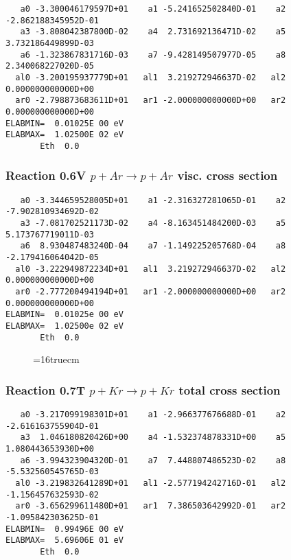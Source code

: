 \documentclass[12pt,dvipdfmx]{article}
\begin{document}
\begin{small}\begin{verbatim}
   a0 -3.300046179597D+01    a1 -5.241652502840D-01    a2 -2.862188345952D-01
   a3 -3.808042387800D-02    a4  2.731692136471D-02    a5  3.732186449899D-03
   a6 -1.323867831716D-03    a7 -9.428149507977D-05    a8  2.340068227020D-05
  al0 -3.200195937779D+01   al1  3.219272946637D-02   al2  0.000000000000D+00
  ar0 -2.798873683611D+01   ar1 -2.000000000000D+00   ar2  0.000000000000D+00
ELABMIN=  0.01025E 00 eV
ELABMAX=  1.02500E 02 eV
       Eth  0.0
\end{verbatim}\end{small}

\subsubsection{
Reaction 0.6V   $ p + Ar \rightarrow p + Ar  $ visc. cross
section }


\begin{small}\begin{verbatim}
   a0 -3.344659528005D+01    a1 -2.316327281065D-01    a2 -7.902810934692D-02
   a3 -7.081702521173D-02    a4 -8.163451484200D-03    a5  5.173767719011D-03
   a6  8.930487483240D-04    a7 -1.149225205768D-04    a8 -2.179416064042D-05
  al0 -3.222949872234D+01   al1  3.219272946637D-02   al2  0.000000000000D+00
  ar0 -2.777200494194D+01   ar1 -2.000000000000D+00   ar2  0.000000000000D+00
ELABMIN=  0.01025e 00 eV
ELABMAX=  1.02500e 02 eV
       Eth  0.0
\end{verbatim}\end{small}



\begin{figure} \label{0.6}
\epsfxsize=16truecm
\end{figure}
\newpage



\subsubsection{
Reaction 0.7T   $ p + Kr \rightarrow p + Kr $ total cross
section }



\begin{small}\begin{verbatim}
   a0 -3.217099198301D+01    a1 -2.966377676688D-01    a2 -2.616163755904D-01
   a3  1.046180820426D+00    a4 -1.532374878331D+00    a5  1.080443653930D+00
   a6 -3.994323904320D-01    a7  7.448807486523D-02    a8 -5.532560545765D-03
  al0 -3.219832641289D+01   al1 -2.577194242716D-01   al2 -1.156457632593D-02
  ar0 -3.656299611480D+01   ar1  7.386503642992D-01   ar2 -1.095842303625D-01
ELABMIN=  0.99496E 00 eV
ELABMAX=  5.69606E 01 eV
       Eth  0.0
\end{verbatim}\end{small}
\end{document}
